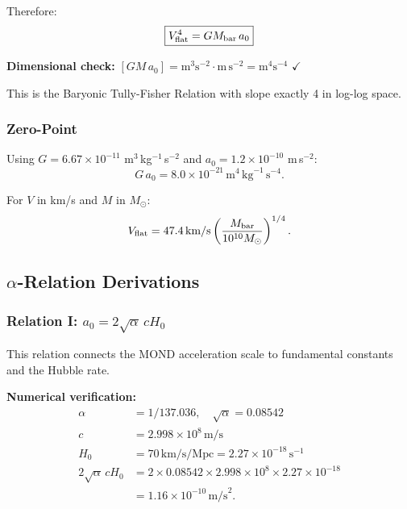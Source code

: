 Therefore:
\begin{equation}
\boxed{V_{\rm flat}^4 = GM_{\rm bar}\,a_0}
\label{eq:btfr_derived}
\end{equation}

\textbf{Dimensional check:} $[GM\,a_0] = \text{m}^3\text{s}^{-2} \cdot \text{m}\,\text{s}^{-2} = \text{m}^4\text{s}^{-4}$ $\checkmark$

This is the Baryonic Tully-Fisher Relation with slope exactly 4 in log-log space.

\subsubsection{Zero-Point}

Using $G = 6.67 \times 10^{-11}$ m$^3$\,kg$^{-1}$\,s$^{-2}$ and 
$a_0 = 1.2 \times 10^{-10}$ m\,s$^{-2}$:
\begin{equation}
G\,a_0 = 8.0 \times 10^{-21}\,\text{m}^4\,\text{kg}^{-1}\,\text{s}^{-4}.
\end{equation}

For $V$ in km/s and $M$ in $M_\odot$:
\begin{equation}
V_{\rm flat} = 47.4\,\text{km/s}\left(\frac{M_{\rm bar}}{10^{10}M_\odot}\right)^{1/4}.
\end{equation}

\subsection{$\alpha$-Relation Derivations}\label{app:alpha}

\subsubsection{Relation I: $a_0 = 2\sqrt{\alpha}\,cH_0$}

This relation connects the MOND acceleration scale to fundamental constants 
and the Hubble rate.

\textbf{Numerical verification:}
\begin{align}
\alpha &= 1/137.036, \quad \sqrt{\alpha} = 0.08542 \\
c &= 2.998 \times 10^8\,\text{m/s} \\
H_0 &= 70\,\text{km/s/Mpc} = 2.27 \times 10^{-18}\,\text{s}^{-1} \\
2\sqrt{\alpha}\,cH_0 &= 2 \times 0.08542 \times 2.998 \times 10^8 \times 2.27 \times 10^{-18} \\
&= 1.16 \times 10^{-10}\,\text{m/s}^2.
\end{align}


